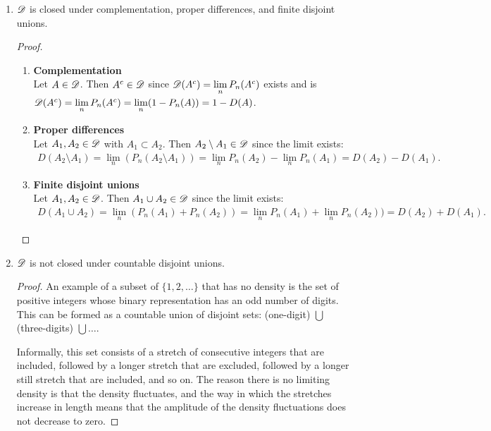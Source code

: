 \begin{enumerate}
\begin{enumerate}[label=(\alph*)]
\begin{enumerate}
\begin{proof}
        $P_n(\Omega) = 1$ for all $n$, therefore the limit exists and
        is $D(\Omega) := \lim_{n\to\infty} 1 = 1$, therefore $\Omega \in \ms D$.
      \end{proof}
    \item
      \begin{claim*}
        $\mathscr D$ is closed under complementation, proper differences, and finite disjoint unions.
      \end{claim*}
      \begin{proof}
        \begin{enumerate}
        \item {\bf Complementation}\\
          Let $A \in \mathscr D$. Then $A^c \in \mathscr D$ since $\ms D(A^c) = \lim_n P_n(A^c)$ exists and
          is $\ms D(A^c) = \lim_n P_n(A^c) = \lim_n (1 - P_n(A)) = 1 - D(A)$.
        \item {\bf Proper differences}\\
          Let $A_1, A_2 \in \mathscr D$ with $A_1 \subset A_2$. Then $A_2 \setminus A_1 \in \mathscr D$ since the limit exists:
          \begin{align*}
            D(A_2 \setminus A_1) = \lim_n (P_n(A_2 \setminus A_1)) = \lim_n P_n(A_2) - \lim_nP_n(A_1) = D(A_2) - D(A_1).
          \end{align*}
        \item {\bf Finite disjoint unions}\\
          Let $A_1, A_2 \in \mathscr D$. Then $A_1 \cup A_2 \in \mathscr D$ since the limit exists:
          \begin{align*}
            D(A_1 \cup A_2) = \lim_n (P_n(A_1) + P_n(A_2)) = \lim_n P_n(A_1) + \lim_n  P_n(A_2)) = D(A_2) + D(A_1).
          \end{align*}
        \end{enumerate}
      \end{proof}
    \item
      \begin{claim*}
        $\mathscr D$ is not closed under countable disjoint unions.
      \end{claim*}
      \begin{proof}
        An example of a subset of $\{1, 2, \ldots\}$ that has no density is the set of positive integers whose
        binary representation has an odd number of digits. This can be formed as a countable union of disjoint
        sets: (one-digit) $\bigcup$ (three-digits) $\bigcup \ldots$.

        Informally, this set consists of a stretch of consecutive integers that are included, followed by a
        longer stretch that are excluded, followed by a longer still stretch that are included, and so on. The
        reason there is no limiting density is that the density fluctuates, and the way in which the stretches
        increase in length means that the amplitude of the density fluctuations does not decrease to zero.


\end{proof}
\end{enumerate}
\end{enumerate}
\end{enumerate}
